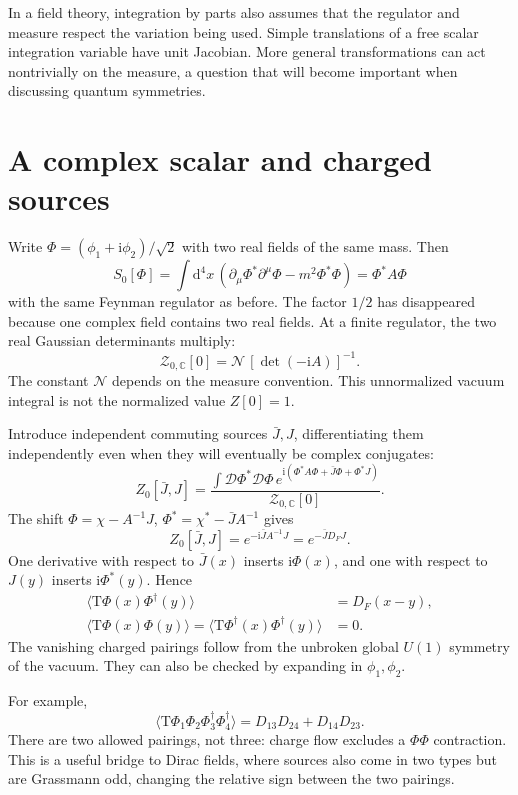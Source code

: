 \documentclass[11pt]{article}
\newcommand{\dd}{\mathrm d}
\newcommand{\ii}{\mathrm i}
\newcommand{\D}{\mathcal D}
\newcommand{\Tord}{\mathrm T}
\newcommand{\module}[1]{\clearpage\section{#1}}
\begin{document}
In a field theory, integration by parts also assumes that the regulator
and measure respect the variation being used. Simple translations of
a free scalar integration variable have unit Jacobian. More general
transformations can act nontrivially on the measure, a question that
will become important when discussing quantum symmetries.

\module{A complex scalar and charged sources}
Write \(\Phi=(\phi_1+\ii\phi_2)/\sqrt2\) with two real fields of
the same mass. Then
\begin{equation}
 S_0[\Phi]=\int\dd^4x\,
 (\partial_\mu\Phi^*\partial^\mu\Phi-m^2\Phi^*\Phi)
 =\Phi^*A\Phi
\end{equation}
with the same Feynman regulator as before. The factor \(1/2\) has
disappeared because one complex field contains two real fields.
At a finite regulator, the two real Gaussian determinants multiply:
\begin{equation}
 \mathcal Z_{0,\mathbb C}[0]=\mathcal N\,[\det(-\ii A)]^{-1}.
\end{equation}
The constant \(\mathcal N\) depends on the measure convention. This
unnormalized vacuum integral is not the normalized value \(Z[0]=1\).

Introduce independent commuting sources \(\bar J,J\), differentiating
them independently even when they will eventually be complex conjugates:
\begin{equation}
 Z_0[\bar J,J]=
 \frac{\int\D\Phi^*\D\Phi\,
 e^{\ii(\Phi^*A\Phi+\bar J\Phi+\Phi^*J)}}{\mathcal Z_{0,\mathbb C}[0]}.
\end{equation}
The shift \(\Phi=\chi-A^{-1}J\),
\(\Phi^*=\chi^*-\bar JA^{-1}\) gives
\begin{equation}
 Z_0[\bar J,J]=e^{-\ii\bar JA^{-1}J}=e^{-\bar JD_FJ}.
                                                        \label{eq:complexZ}
\end{equation}
One derivative with respect to \(\bar J(x)\) inserts \(\ii\Phi(x)\),
and one with respect to \(J(y)\) inserts \(\ii\Phi^*(y)\). Hence
\begin{align}
 \langle\Tord\Phi(x)\Phi^\dagger(y)\rangle&=D_F(x-y),\\
 \langle\Tord\Phi(x)\Phi(y)\rangle
 =\langle\Tord\Phi^\dagger(x)\Phi^\dagger(y)\rangle&=0.
\end{align}
The vanishing charged pairings follow from the unbroken global
\(U(1)\) symmetry of the vacuum. They can also be checked by expanding
in \(\phi_1,\phi_2\).

For example,
\begin{equation}
 \langle\Tord\Phi_1\Phi_2\Phi^\dagger_3\Phi^\dagger_4\rangle
 =D_{13}D_{24}+D_{14}D_{23}.                          \label{eq:complex4}
\end{equation}
There are two allowed pairings, not three: charge flow excludes a
\(\Phi\Phi\) contraction. This is a useful bridge to Dirac fields,
where sources also come in two types but are Grassmann odd, changing
the relative sign between the two pairings.
\end{document}
